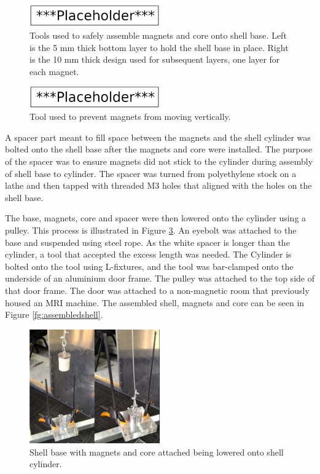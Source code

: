 \documentclass[a4paper,12pt]{article}
\begin{document}
\begin{figure}[h!]
    \centering
    \includegraphics[width=0.5\textwidth]{placeholder.png}
    \caption{Tools used to safely assemble magnets and core onto shell base. Left is the 5 mm thick bottom layer to hold the shell base in place. Right is the 10 mm thick design used for subsequent layers, one layer for each magnet.}
    \label{fg:assemblingmagnet}
\end{figure}

\begin{figure}[h!]
    \centering
    \includegraphics[width=0.5\textwidth]{placeholder.png}
    \caption{Tool used to prevent magnets from moving vertically.}
    \label{fg:assmeblinground}
\end{figure}

A spacer part meant to fill space between the magnets and the shell cylinder was bolted onto the shell base after the magnets and core were installed. The purpose of the spacer was to ensure magnets did not stick to the cylinder during assembly of shell base to cylinder. The spacer was turned from polyethylene stock on a lathe and then tapped with threaded M3 holes that aligned with the holes on the shell base.

The base, magnets, core and spacer were then lowered onto the cylinder using a pulley. This process is illustrated in Figure \ref{fg:assemblingshell}. An eyebolt was attached to the base and suspended using steel rope. As the white spacer is longer than the cylinder, a tool that accepted the excess length was needed. The Cylinder is bolted onto the tool using L-fixtures, and the tool was bar-clamped onto the underside of an aluminium door frame. The pulley was attached to the top side of that door frame. The door was attached to a non-magnetic room that previously housed an MRI machine. The assembled shell, magnets and core can be seen in Figure \ref{fg:assembledshell}.

\begin{figure}[h!]
    \centering
    \includegraphics[width=0.5\textwidth]{assemblingshell.jpg}
    \caption{Shell base with magnets and core attached being lowered onto shell cylinder.}
    \label{fg:assemblingshell}
\end{figure}
\end{document}
